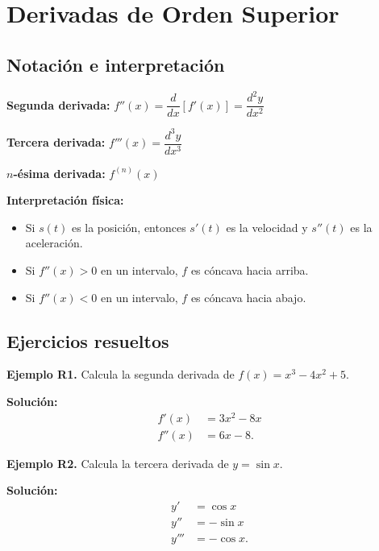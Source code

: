 \documentclass[12pt, a4paper]{article}
\begin{document}
\section{Derivadas de Orden Superior}

\subsection{Notación e interpretación}

\begin{cuadroteoria}
  \textbf{Segunda derivada:} $f''(x) = \dfrac{d}{dx}[f'(x)] = \dfrac{d^2y}{dx^2}$

  \textbf{Tercera derivada:} $f'''(x) = \dfrac{d^3y}{dx^3}$

  \textbf{$n$-ésima derivada:} $f^{(n)}(x)$

  \textbf{Interpretación física:}
  \begin{itemize}[leftmargin=*]
    \item Si $s(t)$ es la posición, entonces $s'(t)$ es la velocidad y $s''(t)$ es la aceleración.
    \item Si $f''(x) > 0$ en un intervalo, $f$ es cóncava hacia arriba.
    \item Si $f''(x) < 0$ en un intervalo, $f$ es cóncava hacia abajo.
  \end{itemize}
\end{cuadroteoria}

\subsection{Ejercicios resueltos}

\textbf{Ejemplo R1.} Calcula la segunda derivada de $f(x) = x^3 - 4x^2 + 5$.

\begin{cuadrosolucion}
  \textbf{Solución:}
  \begin{align*}
    f'(x)  & = 3x^2 - 8x \\
    f''(x) & = 6x - 8.
  \end{align*}
\end{cuadrosolucion}

\textbf{Ejemplo R2.} Calcula la tercera derivada de $y = \sin x$.

\begin{cuadrosolucion}
  \textbf{Solución:}
  \begin{align*}
    y'   & = \cos x   \\
    y''  & = -\sin x  \\
    y''' & = -\cos x.
  \end{align*}
\end{cuadrosolucion}
\end{document}
